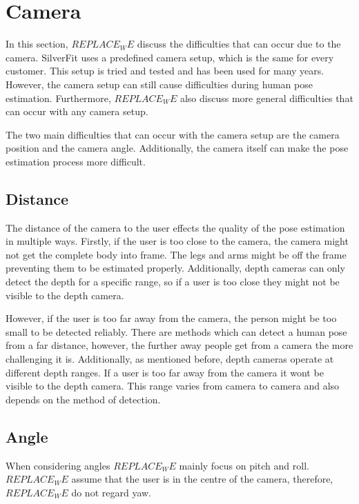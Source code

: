 \section{Camera}

In this section, $REPLACE_WE$ discuss the difficulties that can occur due to the camera. SilverFit uses a predefined camera setup, which is the same for every customer. This setup is tried and tested and has been used for many years. However, the camera setup can still cause difficulties during human pose estimation. Furthermore, $REPLACE_WE$ also discuss more general difficulties that can occur with any camera setup.

The two main difficulties that can occur with the camera setup are the camera position and the camera angle. Additionally, the camera itself can make the pose estimation process more difficult.

\subsection{Distance}

The distance of the camera to the user effects the quality of the pose estimation in multiple ways. Firstly, if the user is too close to the camera, the camera might not get the complete body into frame. The legs and arms might be off the frame preventing them to be estimated properly. Additionally, depth cameras can only detect the depth for a specific range, so if a user is too close they might not be visible to the depth camera.

However, if the user is too far away from the camera, the person might be too small to be detected reliably. There are methods which can detect a human pose from a far distance, however, the further away people get from a camera the more challenging it is. Additionally, as mentioned before, depth cameras operate at different depth ranges. If a user is too far away from the camera it wont be visible to the depth camera. This range varies from camera to camera and also depends on the method of detection.

\subsection{Angle}

When considering angles $REPLACE_WE$ mainly focus on pitch and roll. $REPLACE_WE$ assume that the user is in the centre of the camera, therefore, $REPLACE_WE$ do not regard yaw.

